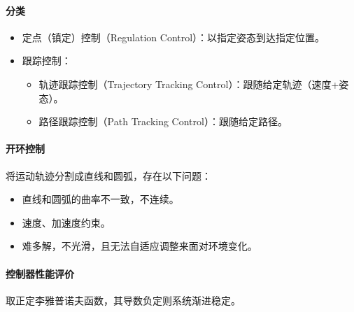 \documentclass[
12pt, %
a4paper, 
oneside, %
headinclude,footinclude, %
]{scrartcl}
\begin{document}
\paragraph{分类}
\begin{itemize}
\item 定点（镇定）控制（Regulation Control）：以指定姿态到达指定位置。
\item 跟踪控制：
\begin{itemize}
\item 轨迹跟踪控制（Trajectory Tracking Control）：跟随给定轨迹（速度+姿态）。
\item 路径跟踪控制（Path Tracking Control）：跟随给定路径。
\end{itemize}
\end{itemize}
\paragraph{开环控制}
将运动轨迹分割成直线和圆弧，存在以下问题：
\begin{itemize}
\item 直线和圆弧的曲率不一致，不连续。
\item 速度、加速度约束。
\item 难多解，不光滑，且无法自适应调整来面对环境变化。
\end{itemize}
\paragraph{控制器性能评价}
取正定李雅普诺夫函数，其导数负定则系统渐进稳定。
\end{document}
